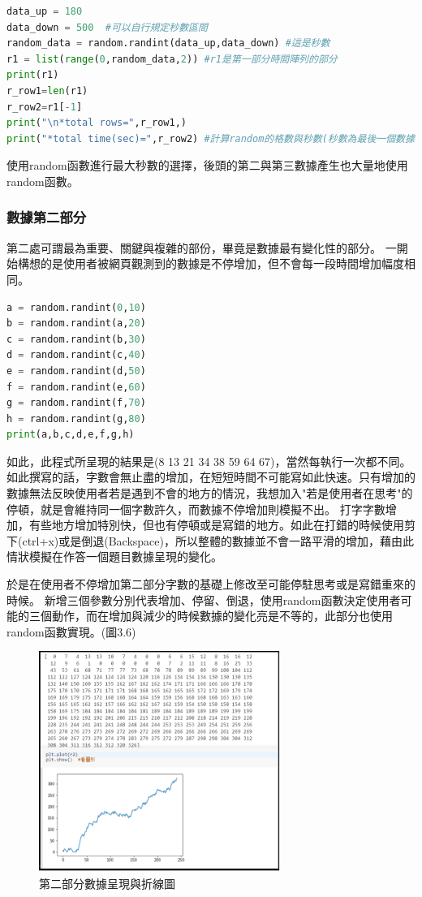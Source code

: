 \begin{lstlisting}[language=Python,caption=python數據第一部分]
data_up = 180
data_down = 500  #可以自行規定秒數區間
random_data = random.randint(data_up,data_down) #這是秒數
r1 = list(range(0,random_data,2)) #r1是第一部分時間陣列的部分
print(r1)
r_row1=len(r1)
r_row2=r1[-1]
print("\n*total rows=",r_row1,)
print("*total time(sec)=",r_row2) #計算random的格數與秒數(秒數為最後一個數據)
\end{lstlisting}
使用random函數進行最大秒數的選擇，後頭的第二與第三數據產生也大量地使用random函數。
\subsubsection{數據第二部分}
第二處可謂最為重要、關鍵與複雜的部份，畢竟是數據最有變化性的部分。
一開始構想的是使用者被網頁觀測到的數據是不停增加，但不會每一段時間增加幅度相同。

\begin{lstlisting}[language=Python,caption=python數據第二部分]
a = random.randint(0,10)
b = random.randint(a,20)
c = random.randint(b,30)
d = random.randint(c,40)
e = random.randint(d,50)
f = random.randint(e,60)
g = random.randint(f,70)
h = random.randint(g,80)
print(a,b,c,d,e,f,g,h)
\end{lstlisting}

如此，此程式所呈現的結果是(8 13 21 34 38 59 64 67)，當然每執行一次都不同。
如此撰寫的話，字數會無止盡的增加，在短短時間不可能寫如此快速。只有增加的數據無法反映使用者若是遇到不會的地方的情況，我想加入"若是使用者在思考"的停頓，就是會維持同一個字數許久，而數據不停增加則模擬不出。
打字字數增加，有些地方增加特別快，但也有停頓或是寫錯的地方。如此在打錯的時候使用剪下(ctrl+x)或是倒退(Backspace)，所以整體的數據並不會一路平滑的增加，藉由此情狀模擬在作答一個題目數據呈現的變化。

於是在使用者不停增加第二部分字數的基礎上修改至可能停駐思考或是寫錯重來的時候。
新增三個參數分別代表增加、停留、倒退，使用random函數決定使用者可能的三個動作，而在增加與減少的時候數據的變化亮是不等的，此部分也使用random函數實現。(圖3.6)
\begin{figure}[H] %
	\centering %
	\includegraphics[width=0.7\textwidth]{3_2_1_4.png} %
	\caption{第二部分數據呈現與折線圖} %
	\label{Fig.3.6} %
\end{figure}
